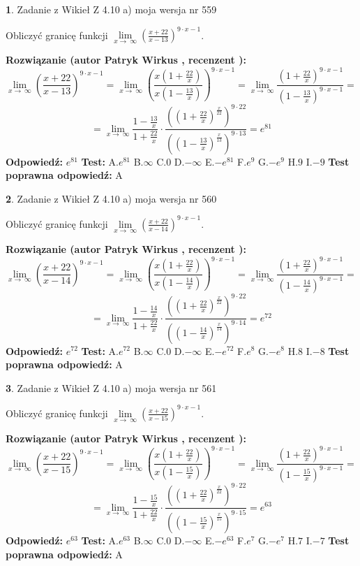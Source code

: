 \documentclass[12pt, a4paper]{article}
\theoremstyle{definition} %
\newtheorem{zad}{}
\newcommand{\zadStart}[1]{\begin{zad}#1\newline}
\newcommand{\zadStop}{\end{zad}}
\newcommand{\rozwStart}[2]{\noindent \textbf{Rozwiązanie (autor #1 , recenzent #2): }\newline}
\newcommand{\rozwStop}{\newline}
\newcommand{\odpStart}{\noindent \textbf{Odpowiedź:}\newline}
\newcommand{\odpStop}{\newline}
\newcommand{\testStart}{\noindent \textbf{Test:}\newline}
\newcommand{\testStop}{\newline}
\newcommand{\kluczStart}{\noindent \textbf{Test poprawna odpowiedź:}\newline}
\newcommand{\kluczStop}{\newline}
\begin{document}
\zadStart{Zadanie z Wikieł Z 4.10 a) moja wersja nr 559}

Obliczyć granicę funkcji  $\lim\limits_{x\to\ \infty}(\frac{x+22}{x-13})^{9\cdot x-1}$.
\zadStop
\rozwStart{Patryk Wirkus}{}
$$\lim\limits_{x\to\ \infty}(\frac{x+22}{x-13})^{9\cdot x-1} = \lim\limits_{x\to\ \infty}(\frac{x(1+\frac{22}{x})}{x(1-\frac{13}{x})})^{9\cdot x-1}=\lim\limits_{x\to\ \infty}\frac{(1+\frac{22}{x})^{9\cdot x-1}}{(1-\frac{13}{x})^{9\cdot x-1}}=$$
$$=\lim\limits_{x\to\ \infty}\frac{1-\frac{13}{x}}{1+\frac{22}{x}}\cdot\frac{((1+\frac{22}{x})^{\frac{x}{22}})^{9\cdot22}}{((1-\frac{13}{x})^{\frac{x}{13}})^{9\cdot13}}=e^{81}$$
\rozwStop
\odpStart
$e^{81}$
\odpStop
\testStart
A.$e^{81}$ B.$\infty$ C.$0$ D.$-\infty$ E.$-e^{81}$
F.$e^{9}$ G.$-e^{9}$
H.$9$
I.$-9$
\testStop
\kluczStart
A
\kluczStop



\zadStart{Zadanie z Wikieł Z 4.10 a) moja wersja nr 560}

Obliczyć granicę funkcji  $\lim\limits_{x\to\ \infty}(\frac{x+22}{x-14})^{9\cdot x-1}$.
\zadStop
\rozwStart{Patryk Wirkus}{}
$$\lim\limits_{x\to\ \infty}(\frac{x+22}{x-14})^{9\cdot x-1} = \lim\limits_{x\to\ \infty}(\frac{x(1+\frac{22}{x})}{x(1-\frac{14}{x})})^{9\cdot x-1}=\lim\limits_{x\to\ \infty}\frac{(1+\frac{22}{x})^{9\cdot x-1}}{(1-\frac{14}{x})^{9\cdot x-1}}=$$
$$=\lim\limits_{x\to\ \infty}\frac{1-\frac{14}{x}}{1+\frac{22}{x}}\cdot\frac{((1+\frac{22}{x})^{\frac{x}{22}})^{9\cdot22}}{((1-\frac{14}{x})^{\frac{x}{14}})^{9\cdot14}}=e^{72}$$
\rozwStop
\odpStart
$e^{72}$
\odpStop
\testStart
A.$e^{72}$ B.$\infty$ C.$0$ D.$-\infty$ E.$-e^{72}$
F.$e^{8}$ G.$-e^{8}$
H.$8$
I.$-8$
\testStop
\kluczStart
A
\kluczStop



\zadStart{Zadanie z Wikieł Z 4.10 a) moja wersja nr 561}

Obliczyć granicę funkcji  $\lim\limits_{x\to\ \infty}(\frac{x+22}{x-15})^{9\cdot x-1}$.
\zadStop
\rozwStart{Patryk Wirkus}{}
$$\lim\limits_{x\to\ \infty}(\frac{x+22}{x-15})^{9\cdot x-1} = \lim\limits_{x\to\ \infty}(\frac{x(1+\frac{22}{x})}{x(1-\frac{15}{x})})^{9\cdot x-1}=\lim\limits_{x\to\ \infty}\frac{(1+\frac{22}{x})^{9\cdot x-1}}{(1-\frac{15}{x})^{9\cdot x-1}}=$$
$$=\lim\limits_{x\to\ \infty}\frac{1-\frac{15}{x}}{1+\frac{22}{x}}\cdot\frac{((1+\frac{22}{x})^{\frac{x}{22}})^{9\cdot22}}{((1-\frac{15}{x})^{\frac{x}{15}})^{9\cdot15}}=e^{63}$$
\rozwStop
\odpStart
$e^{63}$
\odpStop
\testStart
A.$e^{63}$ B.$\infty$ C.$0$ D.$-\infty$ E.$-e^{63}$
F.$e^{7}$ G.$-e^{7}$
H.$7$
I.$-7$
\testStop
\kluczStart
A
\kluczStop
\end{document}
